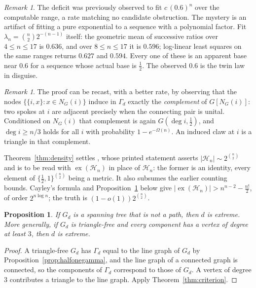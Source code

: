 \documentclass[11pt]{article}
\newtheorem{proposition}[theorem]{Proposition}
\theoremstyle{definition}
\theoremstyle{remark}
\newtheorem{remark}[theorem]{Remark}
\newcommand{\Ha}{\mathcal{H}}
\newcommand{\ex}{\operatorname{ex}}
\begin{document}
\begin{remark}\label{rem:illusion}
The deficit was previously observed to fit $c\,(0.6)^n$ over the computable range, a rate
matching no candidate obstruction. The mystery is an artifact of fitting a pure exponential
to a sequence with a polynomial factor. Fit $\lambda_n=\binom n2 2^{-(n-1)}$ itself: the
geometric mean of successive ratios over $4\leq n\leq17$ is $0.636$, and over
$8\leq n\leq17$ it is $0.596$; log-linear least squares on the same ranges returns $0.627$
and $0.594$. Every one of these is an apparent base near $0.6$ for a sequence whose actual
base is $\tfrac12$. The observed $0.6$ is the twin law in disguise.
\end{remark}

\begin{remark}\label{rem:starcomplement}
The proof can be recast, with a better rate, by observing that the nodes
$\{\{i,x\}:x\in N_G(i)\}$ induce in $\Gamma_d$ exactly the \emph{complement} of
$G[N_G(i)]$: two spokes at $i$ are adjacent precisely when the connecting pair is unital.
Conditioned on $N_G(i)$ that complement is again $G(\deg i,\tfrac12)$, and $\deg i\geq n/3$
holds for all $i$ with probability $1-e^{-\Omega(n)}$. An induced claw at $i$ is a triangle
in that complement.
\end{remark}

Theorem~\ref{thm:density} settles \cite[Conjecture 4.1.4]{Kehoe19}, whose printed statement
asserts $|\Ha_n|\sim2^{\binom n2}$ and is to be read with $\ex(\Ha_n)$ in place of $\Ha_n$:
the former is an identity, every element of $\{\tfrac12,1\}^{\binom n2}$ being a metric. It
also subsumes the earlier counting bounds. Cayley's formula and Proposition~\ref{prop:tree}
below give $|\ex(\Ha_n)|>n^{n-2}-\tfrac{n!}2$, of order $2^{n\log n}$; the truth is
$(1-o(1))2^{\binom n2}$.

\begin{proposition}\label{prop:tree}
If $G_d$ is a spanning tree that is not a path, then $d$ is extreme. More generally, if
$G_d$ is triangle-free and every component has a vertex of degree at least $3$, then $d$ is
extreme.
\end{proposition}

\begin{proof}
A triangle-free $G_d$ has $\Gamma_d$ equal to the line graph of $G_d$ by
Proposition~\ref{prop:halfonegamma}, and the line graph of a connected graph is connected,
so the components of $\Gamma_d$ correspond to those of $G_d$. A vertex of degree $3$
contributes a triangle to the line graph. Apply Theorem~\ref{thm:criterion}.
\end{proof}
\end{document}
